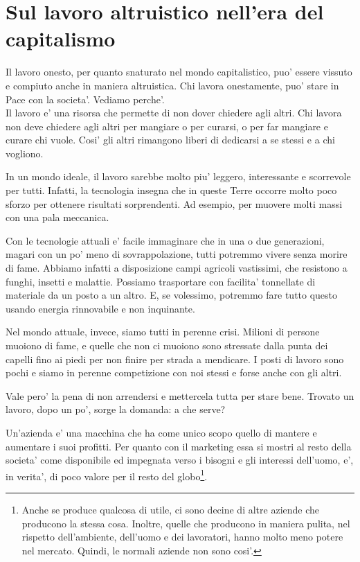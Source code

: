 \chapter{Sul lavoro altruistico nell'era del capitalismo}
\label{altruismoLavoro}

Il lavoro onesto, per quanto snaturato nel mondo capitalistico, puo' essere vissuto e compiuto anche in maniera altruistica. Chi lavora onestamente, puo' stare in Pace con la societa'. Vediamo perche'. \\

Il lavoro e' una risorsa che permette di non dover chiedere agli altri. Chi lavora non deve chiedere agli altri per mangiare o per curarsi, o per far mangiare e curare chi vuole.  Cosi' gli altri rimangono liberi di dedicarsi a se stessi e a chi vogliono. 

In un mondo ideale, il lavoro sarebbe molto piu' leggero, interessante e scorrevole per tutti. Infatti, la tecnologia insegna che in queste Terre occorre molto poco sforzo per ottenere risultati sorprendenti. Ad esempio, per muovere molti massi con una pala meccanica.

Con le tecnologie attuali e' facile immaginare che in una o due generazioni, magari con un po' meno di sovrappolazione, tutti potremmo vivere senza morire di fame.
Abbiamo infatti a disposizione campi agricoli vastissimi, che resistono a funghi, insetti e malattie. Possiamo trasportare con facilita' tonnellate di materiale da un posto a un altro. E, se volessimo, potremmo fare tutto questo usando energia rinnovabile e non inquinante.

Nel mondo attuale, invece, siamo tutti in perenne crisi. Milioni di persone muoiono di fame, e quelle che non ci muoiono sono stressate dalla punta dei capelli fino ai piedi per non finire per strada a mendicare. I posti di lavoro sono pochi e siamo in perenne competizione con noi stessi e forse anche con gli altri.

Vale pero' la pena di non arrendersi e mettercela tutta per stare bene. Trovato un lavoro, dopo un po', sorge la domanda: a che serve?

Un'azienda e' una macchina che ha come unico scopo quello di mantere e aumentare i suoi profitti. Per quanto con il marketing essa si mostri al resto della societa' come disponibile ed impegnata verso i bisogni e gli interessi dell'uomo, e', in verita', di poco valore per il resto del globo\footnote{Anche se produce qualcosa di utile, ci sono decine di altre aziende che producono la stessa cosa. Inoltre, quelle che producono in maniera pulita, nel rispetto dell'ambiente, dell'uomo e dei lavoratori, hanno molto meno potere nel mercato. Quindi, le normali aziende non sono cosi'.}.

